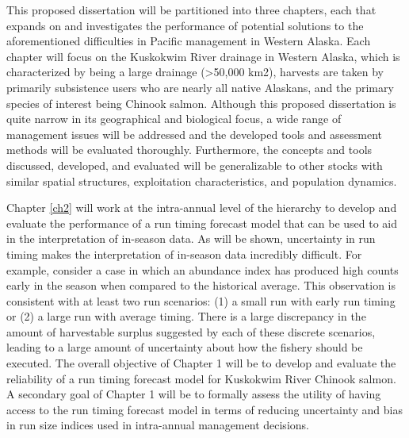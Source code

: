 \documentclass[12pt,]{book}
\theoremstyle{definition}
\theoremstyle{definition}
\theoremstyle{definition}
\theoremstyle{remark}
\begin{document}
This proposed dissertation will be partitioned into three chapters, each
that expands on and investigates the performance of potential solutions
to the aforementioned difficulties in Pacific management in Western
Alaska. Each chapter will focus on the Kuskokwim River drainage in
Western Alaska, which is characterized by being a large drainage
(\textgreater{}50,000 km2), harvests are taken by primarily subsistence
users who are nearly all native Alaskans, and the primary species of
interest being Chinook salmon. Although this proposed dissertation is
quite narrow in its geographical and biological focus, a wide range of
management issues will be addressed and the developed tools and
assessment methods will be evaluated thoroughly. Furthermore, the
concepts and tools discussed, developed, and evaluated will be
generalizable to other stocks with similar spatial structures,
exploitation characteristics, and population dynamics.

Chapter \ref{ch2} will work at the intra-annual level of the hierarchy
to develop and evaluate the performance of a run timing forecast model
that can be used to aid in the interpretation of in-season data. As will
be shown, uncertainty in run timing makes the interpretation of
in-season data incredibly difficult. For example, consider a case in
which an abundance index has produced high counts early in the season
when compared to the historical average. This observation is consistent
with at least two run scenarios: (1) a small run with early run timing
or (2) a large run with average timing. There is a large discrepancy in
the amount of harvestable surplus suggested by each of these discrete
scenarios, leading to a large amount of uncertainty about how the
fishery should be executed. The overall objective of Chapter 1 will be
to develop and evaluate the reliability of a run timing forecast model
for Kuskokwim River Chinook salmon. A secondary goal of Chapter 1 will
be to formally assess the utility of having access to the run timing
forecast model in terms of reducing uncertainty and bias in run size
indices used in intra-annual management decisions.
\end{document}
